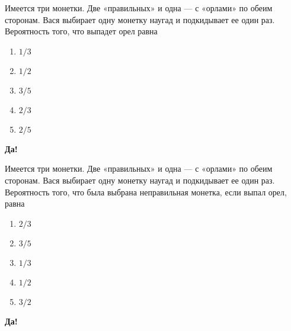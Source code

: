\documentclass[t]{beamer}
\begin{document}
 \begin{frame} \label{5-Yes} 
\begin{block}{5} 

Имеется три монетки. Две «правильных» и одна — с «орлами» по обеим сторонам. Вася выбирает одну монетку наугад и подкидывает ее один раз. Вероятность того, что выпадет орел равна
     


 \end{block} 
\begin{enumerate} 
\item[] \hyperlink{5-No}{\beamergotobutton{} $1/3$}
\item[] \hyperlink{5-No}{\beamergotobutton{} $1/2$}
\item[] \hyperlink{5-No}{\beamergotobutton{} $3/5$}
\item[] \hyperlink{5-Yes}{\beamergotobutton{} $2/3$}
\item[] \hyperlink{5-No}{\beamergotobutton{} $2/5$
}
\end{enumerate} 

 \textbf{Да!} 
 \hyperlink{6}{}\end{frame} 


 \begin{frame} \label{6-Yes} 
\begin{block}{6} 

Имеется три монетки. Две «правильных» и одна — с «орлами» по обеим сторонам. Вася выбирает одну монетку наугад и подкидывает ее один раз. Вероятность того, что была выбрана неправильная монетка, если выпал орел, равна
   


 \end{block} 
\begin{enumerate} 
\item[] \hyperlink{6-No}{\beamergotobutton{} $2/3$}
\item[] \hyperlink{6-No}{\beamergotobutton{} $3/5$}
\item[] \hyperlink{6-No}{\beamergotobutton{} $1/3$}
\item[] \hyperlink{6-Yes}{\beamergotobutton{} $1/2$}
\item[] \hyperlink{6-No}{\beamergotobutton{} $3/2$
}
\end{enumerate} 

 \textbf{Да!} 
 \hyperlink{7}{}\end{frame} 
\end{document}
